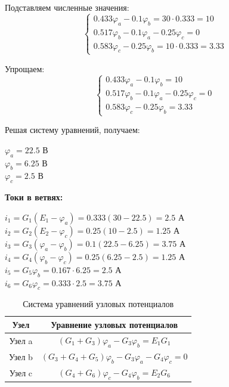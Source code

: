 Подставляем численные значения:
$$\begin{cases}
0.433\varphi_a - 0.1\varphi_b = 30 \cdot 0.333 = 10 \\
0.517\varphi_b - 0.1\varphi_a - 0.25\varphi_c = 0 \\
0.583\varphi_c - 0.25\varphi_b = 10 \cdot 0.333 = 3.33
\end{cases}$$

Упрощаем:
$$\begin{cases}
0.433\varphi_a - 0.1\varphi_b = 10 \\
0.517\varphi_b - 0.1\varphi_a - 0.25\varphi_c = 0 \\
0.583\varphi_c - 0.25\varphi_b = 3.33
\end{cases}$$

Решая систему уравнений, получаем:
\begin{flushleft}
$\varphi_a = 22.5$ В \\
$\varphi_b = 6.25$ В \\
$\varphi_c = 2.5$ В
\end{flushleft}

\textbf{Токи в ветвях:}
\begin{flushleft}
$i_1 = G_1(E_1 - \varphi_a) = 0.333(30 - 22.5) = 2.5$ А \\
$i_2 = G_2(E_2 - \varphi_c) = 0.25(10 - 2.5) = 1.25$ А \\
$i_3 = G_3(\varphi_a - \varphi_b) = 0.1(22.5 - 6.25) = 3.75$ А \\
$i_4 = G_4(\varphi_b - \varphi_c) = 0.25(6.25 - 2.5) = 1.25$ А \\
$i_5 = G_5\varphi_b = 0.167 \cdot 6.25 = 2.5$ А \\
$i_6 = G_6\varphi_c = 0.333 \cdot 2.5 = 3.75$ А
\end{flushleft}
\begin{table}[H]
\centering
\begin{tabular}{|c|c|}
\hline
\textbf{Узел} & \textbf{Уравнение узловых потенциалов} \\
\hline
Узел a & $(G_1 + G_3)\varphi_a - G_3\varphi_b = E_1 G_1$ \\
\hline
Узел b & $(G_3 + G_4 + G_5)\varphi_b - G_3\varphi_a - G_4\varphi_c = 0$ \\
\hline
Узел c & $(G_4 + G_6)\varphi_c - G_4\varphi_b = E_2 G_6$ \\
\hline
\end{tabular}
\caption{Система уравнений узловых потенциалов}
\label{tab:nodal_potential_equations}
\end{table}

